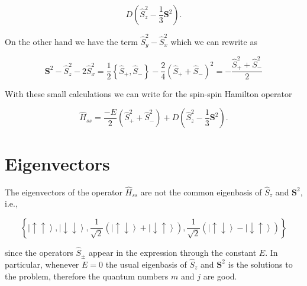 \documentclass[A4paper, 12pt]{article}
\newcommand{\uu}{\left | \uparrow\uparrow \right \rangle}
\newcommand{\dd}{\left | \downarrow\downarrow \right \rangle}
\newcommand{\du}{\left | \downarrow\uparrow \right \rangle}
\newcommand{\ud}{\left | \uparrow\downarrow \right \rangle}
\newcommand{\mone}{\frac{1}{\sqrt{2}}\left( \ud + \du\right)}
\newcommand{\mmone}{\frac{1}{\sqrt{2}}\left( \ud - \du\right)}
\begin{document}
\begin{equation}
  D
  \left(
    \hat{S} _{z} ^{2} - \frac{1}{3} \mathbf{S} ^{2}
  \right).
\end{equation}

On the other hand we have the term $ \hat{S} _{y} ^{2} -\hat{S} _{x} ^{2}  $
which we can rewrite as

\begin{equation}
  \mathbf{S} ^{2} - \hat{S}_{z}^{2} - 2 \hat{S}_{x}^{2}
  =
  \frac{1}{2}\left\{\hat{S} _{+} , \hat{S} _{-}  \right\}
  - \frac{2}{4}\left( \hat{S} _{+}  + \hat{S} _{-}   \right) ^{2}
  =
  -\frac{\hat{S} _{+} ^{2} + \hat{S} _{-} ^{2}}{2}
\end{equation}

With these small calculations we can write for the spin-spin Hamilton operator

\begin{equation}
  \label{eq:spin-spin-hamiltonian}
  \hat{H} _{ss}
  =
  \frac{-E}{2}\left( \hat{S} _{+} ^{2} + \hat{S} _{-} ^{2}   \right)
  +
  D
  \left(
    \hat{S} _{z} ^{2} - \frac{1}{3} \mathbf{S}^{2}
  \right).
\end{equation}





\section{Eigenvectors} %
\label{sec:eigenvectors}

The eigenvectors of the operator $ \hat{H} _{ss}   $ are not the common
eigenbasis of $ \hat{S}_{z} $ and $ \mathbf{S}^{2}  $, i.e.,

\begin{equation}
  \left\{
    \uu, \dd, \mone, \mmone
  \right\}
\end{equation}

since the operators $ \hat{S}_{\pm}  $ appear in the expression through the
constant $ E $. In particular, whenever $ E=0 $ the usual eigenbasis of $
\hat{S}_{z}  $ and $ \mathbf{S}^{2}  $ is the solutions to the problem,
therefore the quantum numbers $ m $ and $ j $ are good.\\

\end{document}
